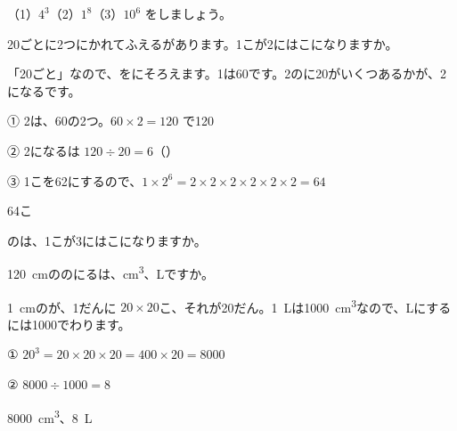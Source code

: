 \begin{jibun}
（1）$4^3$\quad（2）$1^8$\quad（3）$10^6$ をしましょう。
\end{jibun}

\begin{reidai}
20ごとに2つにかれてふえるがあります。1こが2にはこになりますか。\par
\kangaekata 「20ごと」なので、をにそろえます。1は60です。2のに20がいくつあるかが、2になるです。\par
\shiki ① 2は、60の2つ。$60\times2=120$ で120\par
\hspace*{2.6\zw}② 2になるは $120\div20=6$（）\par
\hspace*{2.6\zw}③ 1こを62にするので、$1\times2^6=2\times2\times2\times2\times2\times2=64$\par
\kotae 64こ
\end{reidai}

\begin{jibun}
のは、1こが3にはこになりますか。
\end{jibun}

\begin{reidai}[\R{立方体}{りっ|ぽう|たい}の\R{体積}{たい|せき}とL]
1\qty{20}{cm}ののにるは、\unit{cm^3}、Lですか。\par
{}\qty{1}{cm}のが、1だんに $20\times20$こ、それが20だん。\qty{1}{L}は\qty{1000}{cm^3}なので、Lにするには1000でわります。\par
\shiki ① $20^3=20\times20\times20=400\times20=8000$\par
\hspace*{2.6\zw}② $8000\div1000=8$\par
\kotae \qty{8000}{cm^3}、\qty{8}{L}
\end{reidai}

